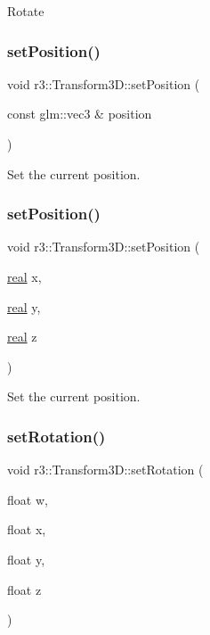 Rotate \mbox{\label{classr3_1_1_transform3_d_a24bf42a0f16e38b66bd6a3ecf4f026c4}} 
\subsubsection{\texorpdfstring{set\+Position()}{setPosition()}\hspace{0.1cm}{\footnotesize\ttfamily [1/2]}}
{\footnotesize\ttfamily void r3\+::\+Transform3\+D\+::set\+Position (\begin{DoxyParamCaption}\item[{const glm\+::vec3 \&}]{position }\end{DoxyParamCaption})}

Set the current position. \mbox{\label{classr3_1_1_transform3_d_adae3a3bf01667c1c6c67d9a817d03a77}} 
\subsubsection{\texorpdfstring{set\+Position()}{setPosition()}\hspace{0.1cm}{\footnotesize\ttfamily [2/2]}}
{\footnotesize\ttfamily void r3\+::\+Transform3\+D\+::set\+Position (\begin{DoxyParamCaption}\item[{\mbox{\hyperlink{namespacer3_ab2016b3e3f743fb735afce242f0dc1eb}{real}}}]{x,  }\item[{\mbox{\hyperlink{namespacer3_ab2016b3e3f743fb735afce242f0dc1eb}{real}}}]{y,  }\item[{\mbox{\hyperlink{namespacer3_ab2016b3e3f743fb735afce242f0dc1eb}{real}}}]{z }\end{DoxyParamCaption})}

Set the current position. \mbox{\label{classr3_1_1_transform3_d_a78c34c186d255ad6dcd0adf7ce199c4e}} 
\subsubsection{\texorpdfstring{set\+Rotation()}{setRotation()}\hspace{0.1cm}{\footnotesize\ttfamily [1/3]}}
{\footnotesize\ttfamily void r3\+::\+Transform3\+D\+::set\+Rotation (\begin{DoxyParamCaption}\item[{float}]{w,  }\item[{float}]{x,  }\item[{float}]{y,  }\item[{float}]{z }\end{DoxyParamCaption})}

